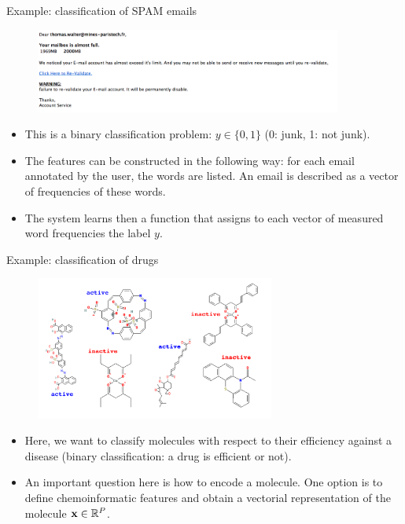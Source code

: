 \documentclass[xcolor=pdftex,dvipsnames,table]{beamer}
\begin{document}
\begin{frame}{Example: classification of SPAM emails}
\begin{figure}[htb]
\includegraphics[width=0.9\textwidth]{../graphics/SPAM_mail.png}
\end{figure}
\begin{itemize}
	\item This is a binary classification problem: $y \in \{0,1\}$ (0: junk, 1: not junk). 
	\item The features can be constructed in the following way: for each email annotated by the user, the words are listed. An email is described as a vector of frequencies of these words. 
	\item The system learns then a function that assigns to each vector of measured word frequencies the label $y$. 
\end{itemize}
\end{frame}

\begin{frame}{Example: classification of drugs}
\begin{figure}[htb]
\includegraphics[width=0.7\textwidth]{../graphics/ml_example_drugs.pdf}
\end{figure}
\begin{itemize}
	\item Here, we want to classify molecules with respect to their efficiency against a disease (binary classification: a drug is efficient or not). 
	\item An important question here is how to encode a molecule. One option is to define chemoinformatic features and obtain a vectorial representation of the molecule $\mathbf{x} \in \mathbb{R}^{P}$. 
\end{itemize}
\end{frame}
\end{document}
